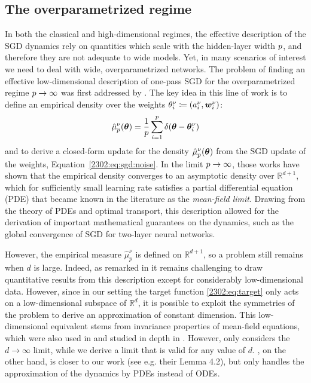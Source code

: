\subsection{The overparametrized regime}
\label{2302:sec:meanfield}
In both the classical and high-dimensional regimes, the effective description of the SGD dynamics rely on quantities which scale with the hidden-layer width $p$, and therefore they are not adequate to wide models. Yet, in many scenarios of interest we need to deal with wide, overparametrized networks. The problem of finding an effective low-dimensional description of one-pass SGD for the overparametrized regime $p\to\infty$ was first addressed by \cite{mei2018mean,chizat2018global,rotskoff2022trainability,sirignano2020mean}. The key idea in this line of work is to define an empirical density over the weights $\theta^{\nu}_{i}\coloneqq (a_{i}^{\nu},{\boldsymbol{w}}^{\nu}_{i})$:
\begin{align}
\hat{\mu}^{\nu}_{p}({\boldsymbol{\theta}}) = \frac{1}{p}\sum\limits_{i=1}^{p} \delta({\boldsymbol{\theta}}-{\boldsymbol{\theta}}_{i}^{\nu})
\end{align}
 and to derive a closed-form update for the density $\hat{\mu}^{\nu}_{p}({\boldsymbol{\theta}})$ from the SGD update of the weights, Equation~\eqref{2302:eq:sgd:noise}. In the limit $p\to\infty$, those works have shown that the empirical density converges to an asymptotic density over $\mathbb{R}^{d+1}$, which for sufficiently small learning rate satisfies a partial differential equation (PDE) that became known in the literature as the \emph{mean-field limit}. Drawing from the theory of PDEs and optimal transport, this description allowed for the derivation of important mathematical guarantees on the dynamics, such as the global convergence of SGD for two-layer neural networks. 

However, the empirical measure $\hat \mu_p^\nu$ is defined on $\mathbb R^{d+1}$, so a problem still remains when $d$ is large. Indeed, as remarked in \cite{bach2022gradient} it remains challenging to draw quantitative results from this description except for considerably low-dimensional data. However, since in our setting the target function \eqref{2302:eq:target} only acts on a low-dimensional subspace of $\mathbb R^d$, it is possible to exploit the symmetries of the problem to derive an approximation of constant dimension. This low-dimensional equivalent stems from invariance properties of mean-field equations, which were also used in \cite{abbe2022merged} and studied in depth in \cite{hajjar2023symmetries}. However,  \cite{abbe2022merged} only considers the $d \to \infty$ limit, while we derive a limit that is valid for any value of $d$.  \cite{hajjar2023symmetries}, on the other hand, is closer to our work (see e.g. their Lemma 4.2), but only handles the approximation of the dynamics by PDEs instead of ODEs.

